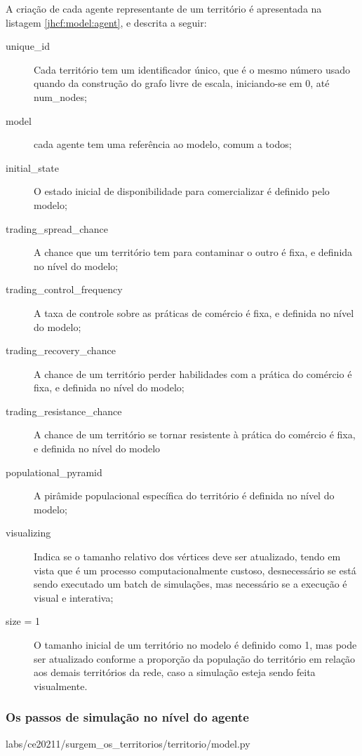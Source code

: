 A criação de cada agente representante de um território é apresentada na listagem \ref{jhcf:model:agent}, e descrita a seguir:
\begin{description}
\item [unique\_id] Cada território tem um identificador único, que é o mesmo número usado quando da construção do grafo livre de escala, iniciando-se em 0, até num\_nodes;
\item [model] cada agente tem uma referência ao modelo, comum a todos;
\item [initial\_state] O estado inicial de disponibilidade para comercializar é definido pelo modelo;
\item [trading\_spread\_chance] A chance que um território tem para contaminar o outro é fixa, e definida no nível do modelo;
\item [trading\_control\_frequency] A taxa de controle sobre as práticas de comércio é fixa, e definida no nível do modelo; 
\item [trading\_recovery\_chance] A chance de um território perder habilidades com a prática do comércio é fixa, e definida no nível do modelo;
\item [trading\_resistance\_chance] A chance de um território se tornar resistente à prática do comércio é fixa, e definida no nível do modelo
\item [populational\_pyramid] A pirâmide populacional específica do território é definida no nível do modelo;
\item [visualizing] Indica se o tamanho relativo dos vértices deve ser atualizado, tendo em vista que é um processo computacionalmente custoso, desnecessário se está sendo executado um batch de simulações, mas necessário se a execução é visual e interativa;
\item [size = 1] O tamanho inicial de um território no modelo é definido como 1, mas pode ser atualizado conforme a proporção da população do território em relação aos demais territórios da rede, caso a simulação esteja sendo feita visualmente.
\end{description}

\subsubsection{Os passos de simulação no nível do agente}


{labs/ce20211/surgem_os_territorios/territorio/model.py}


